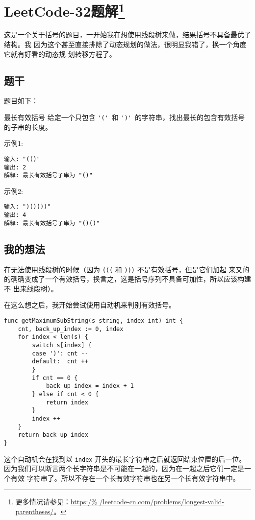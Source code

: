 
\section[LeetCode-32题解]{LeetCode-32题解\footnote{更多情况请参见：\url{https:/%
/leetcode-cn.com/problems/longest-valid-parentheses/}。}}

这是一个关于括号的题目，一开始我在想使用线段树来做，结果括号不具备最优子结构。我
因为这个甚至直接排除了动态规划的做法，很明显我错了，换一个角度它就有好看的动态规
划转移方程了。

\subsection{题干}

题目如下：
\begin{Exple}{最长有效括号}
给定一个只包含 \verb|'('| 和 \verb|')'| 的字符串，找出最长的包含有效括号的子串的长度。

示例1:
\begin{lstlisting}
输入: "(()"
输出: 2
解释: 最长有效括号子串为 "()"
\end{lstlisting}

示例2:
\begin{lstlisting}
输入: ")()())"
输出: 4
解释: 最长有效括号子串为 "()()"
\end{lstlisting}
\end{Exple}

\subsection{我的想法}

在无法使用线段树的时候（因为 \verb|(((| 和 \verb|)))| 不是有效括号，但是它们加起
来又的的确确变成了一个有效括号，换言之，这是括号序列不具备可加性，所以应该构建不
出来线段树）。

在这么想之后，我开始尝试使用自动机来判别有效括号。
\begin{lstlisting}
func getMaximumSubString(s string, index int) int {
    cnt, back_up_index := 0, index
    for index < len(s) {
        switch s[index] {
        case ')': cnt --
        default:  cnt ++
        }
        if cnt == 0 {
            back_up_index = index + 1
        } else if cnt < 0 {
            return index
        }
        index ++
    }
    return back_up_index
}
\end{lstlisting}

这个自动机会在找到以 \verb|index| 开头的最长字符串之后就返回结束位置的后一位。
因为我们可以断言两个长字符串是不可能在一起的，因为在一起之后它们一定是一个有效
字符串了。所以不存在一个长有效字符串也在另一个长有效字符串中。

